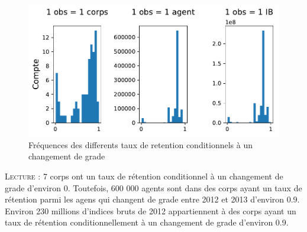 \documentclass[10pt]{article}
\begin{document}
\begin{landscape}
\begin{figure}[H] 
	\caption{Fréquences des differents taux de retention conditionnels à un changement de grade}
	\label{transit1} 
	\includegraphics[scale = 1]{hist_tx_retention_conditionnels.pdf} 
\end{figure}
\center
\begin{minipage}{18cm}
\indent \textsc{Lecture :} 7 corps ont  un taux de rétention conditionnel à un changement de grade d'environ 0. Toutefois, 600 000 agents sont dans des corps ayant un taux de rétention parmi les agens qui changent de grade entre 2012 et 2013 d'environ 0.9. Environ 230 millions d'indices bruts de 2012 appartiennent à des corps ayant un taux de rétention conditionnellement à un changement de grade d'environ 0.9.
\end{minipage}

\end{landscape}
\end{document}
